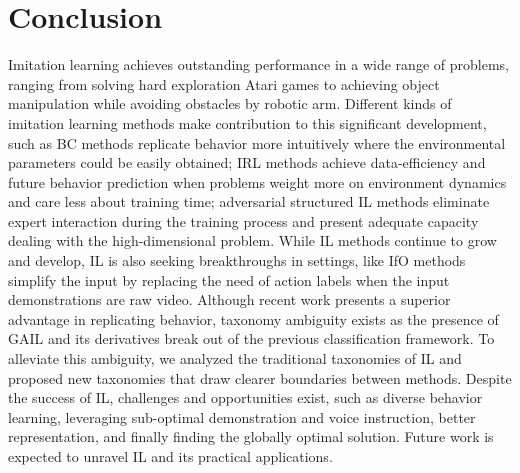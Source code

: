 \documentclass[acmsmall]{acmart}
\begin{document}
\section{Conclusion}
Imitation learning achieves outstanding performance in a wide range of problems, ranging from solving hard exploration Atari games to achieving object manipulation while avoiding obstacles by robotic arm. Different kinds of imitation learning methods make contribution to this significant development, such as BC methods replicate behavior more intuitively where the environmental parameters could be easily obtained; IRL methods achieve data-efficiency and future behavior prediction when problems weight more on environment dynamics and care less about training time; adversarial structured IL methods eliminate expert interaction during the training process and present adequate capacity dealing with the high-dimensional problem. While IL methods continue to grow and develop, IL is also seeking breakthroughs in settings, like IfO methods simplify the input by replacing the need of action labels when the input demonstrations are raw video. Although recent work presents a superior advantage in replicating behavior, taxonomy ambiguity exists as the presence of GAIL and its derivatives break out of the previous classification framework. To alleviate this ambiguity, we analyzed the traditional taxonomies of IL and proposed new taxonomies that draw clearer boundaries between methods. Despite the success of  IL, challenges and opportunities exist, such as diverse behavior learning, leveraging sub-optimal demonstration and voice instruction, better representation, and finally finding the globally optimal solution. Future work is expected to unravel IL and its practical applications.




\end{document}
